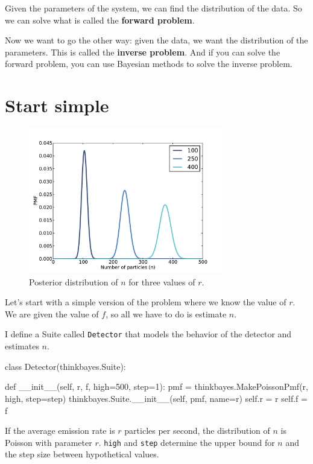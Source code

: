 \documentclass[12pt]{book}
\theoremstyle{exercise}
\begin{document}
Given the parameters of the system, we can find the distribution of
the data.  So we can solve what is called the {\bf forward problem}.

Now we want to go the other way: given the data, we
want the distribution of the parameters.  This is called
the {\bf inverse problem}.  And if you can solve the forward
problem, you can use Bayesian methods to solve the inverse problem.


\section{Start simple}

\begin{figure}
\centerline{\includegraphics[height=2.5in]{figs/jaynes1.pdf}}
\caption{Posterior distribution of $n$ for three values of $r$.}
\label{fig.jaynes1}
\end{figure}

Let's start with a simple version of the problem where we know
the value of $r$.  We are given the value of $f$, so all we
have to do is estimate $n$.

I define a Suite called {\tt Detector} that models the behavior
of the detector and estimates $n$.

\begin{code}
class Detector(thinkbayes.Suite):

    def __init__(self, r, f, high=500, step=1):
        pmf = thinkbayes.MakePoissonPmf(r, high, step=step)
        thinkbayes.Suite.__init__(self, pmf, name=r)
        self.r = r
        self.f = f
\end{code}

If the average emission rate is $r$ particles per second, the
distribution of $n$ is Poisson with parameter $r$.
{\tt high} and {\tt step} determine the upper bound for $n$
and the step size between hypothetical values.
\end{document}
